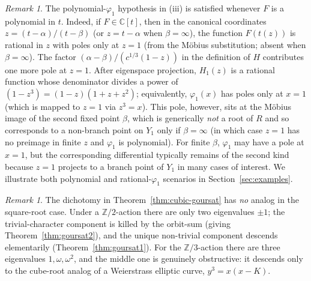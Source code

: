 \documentclass[11pt,a4paper]{article}
\theoremstyle{plain}
\theoremstyle{definition}
\theoremstyle{remark}
\newtheorem{remark}[theorem]{Remark}
\newcommand{\C}{\mathbb{C}}
\newcommand{\Z}{\mathbb{Z}}
\begin{document}
\begin{remark}\label{rmk:f-poly-sufficient}
The polynomial-$\varphi_1$ hypothesis in (iii) is satisfied whenever $F$ is a polynomial in $t$. Indeed, if $F\in\C[t]$, then in the canonical coordinates $z=(t-\alpha)/(t-\beta)$ (or $z=t-\alpha$ when $\beta=\infty$), the function $F(t(z))$ is rational in $z$ with poles only at $z=1$ (from the M\"obius substitution; absent when $\beta=\infty$). The factor $(\alpha-\beta)/(c^{1/3}(1-z))$ in the definition of $H$ contributes one more pole at $z=1$. After eigenspace projection, $H_1(z)$ is a rational function whose denominator divides a power of $(1-z^3) = (1-z)(1+z+z^2)$; equivalently, $\varphi_1(x)$ has poles only at $x=1$ (which is mapped to $z=1$ via $z^3=x$). This pole, however, sits at the M\"obius image of the second fixed point $\beta$, which is generically \emph{not} a root of $R$ and so corresponds to a non-branch point on $Y_1$ only if $\beta=\infty$ (in which case $z=1$ has no preimage in finite $z$ and $\varphi_1$ is polynomial). For finite $\beta$, $\varphi_1$ may have a pole at $x=1$, but the corresponding differential typically remains of the second kind because $z=1$ projects to a branch point of $Y_1$ in many cases of interest. We illustrate both polynomial and rational-$\varphi_1$ scenarios in Section~\ref{sec:examples}.
\end{remark}

\begin{remark}
The dichotomy in Theorem~\ref{thm:cubic-goursat} has \emph{no} analog in the square-root case. Under a $\Z/2$-action there are only two eigenvalues $\pm 1$; the trivial-character component is killed by the orbit-sum (giving Theorem~\ref{thm:goursat2}), and the unique non-trivial component descends elementarily (Theorem~\ref{thm:goursat1}). For the $\Z/3$-action there are three eigenvalues $1,\omega,\omega^2$, and the middle one is genuinely obstructive: it descends only to the cube-root analog of a Weierstrass elliptic curve, $y^3 = x(x-K)$.
\end{remark}
\end{document}
